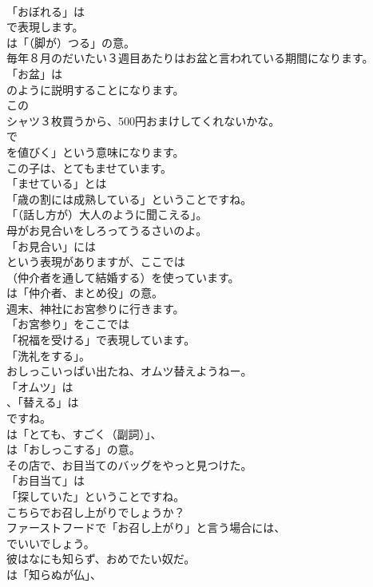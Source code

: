 \documentclass[8pt]{extreport}
\begin{document}
\begin{CJK}{UTF8}{min}
\\	「おぼれる」は 
\\	で表現します。
\\	は「（脚が）つる」の意。	
\\	毎年８月のだいたい３週目あたりはお盆と言われている期間になります。 
\\	「お盆」は
\\	のように説明することになります。	
\\	この
\\	シャツ３枚買うから、500円おまけしてくれないかな。 
\\	で
\\	を値びく」という意味になります。	
\\	この子は、とてもませています。 
\\	「ませている」とは
\\	「歳の割には成熟している」ということですね。
\\	「（話し方が）大人のように聞こえる」。	
\\	母がお見合いをしろってうるさいのよ。 
\\	「お見合い」には
\\	という表現がありますが、ここでは
\\	（仲介者を通して結婚する）を使っています。
\\	は「仲介者、まとめ役」の意。	
\\	週末、神社にお宮参りに行きます。 
\\	「お宮参り」をここでは
\\	「祝福を受ける」で表現しています。
\\	「洗礼をする」。	
\\	おしっこいっぱい出たね、オムツ替えようねー。 
\\	「オムツ」は
\\	、「替える」は
\\	ですね。
\\	は「とても、すごく（副詞）」、
\\	は「おしっこする」の意。	
\\	その店で、お目当てのバッグをやっと見つけた。 
\\	「お目当て」は
\\	「探していた」ということですね。	
\\	こちらでお召し上がりでしょうか？ 
\\	ファーストフードで「お召し上がり」と言う場合には、
\\	でいいでしょう。	
\\	彼はなにも知らず、おめでたい奴だ。 
\\	は「知らぬが仏」、

\end{CJK}
\end{document}
